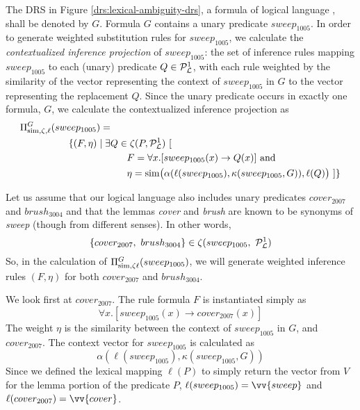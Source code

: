 The DRS in Figure \ref{drs:lexical-ambiguity-drs}, a formula of logical language
\loglang, shall be denoted by $G$.  Formula $G$ contains a unary predicate
$sweep_{1005}$.  In order to generate weighted substitution rules for
$sweep_{1005}$, we calculate the {\it contextualized inference projection} of
$sweep_{1005}$: the set of inference rules mapping $sweep_{1005}$ to each
(unary) predicate $Q \in {\cal{P}}_{{\cal{L}}}^1$, with each rule weighted by the
similarity of the vector representing the context of $sweep_{1005}$ in $G$ to
the vector representing the replacement $Q$. Since the unary predicate  occurs
in exactly one formula, $G$, we calculate the contextualized inference
projection as
\begin{align*}
&\Pi^G_{\simfunc, \zeta, \ell}(sweep_{1005}) = \\
& \hspace{50px} \{ (F, \eta) \mid \exists Q \in \zeta(P, \predsym{\loglang}^1)~[ \\
& \hspace{110px} F = \forall x.[sweep_{1005}(x) \to Q(x)] \text{ and } \\
& \hspace{110px} \eta = \simfunc\big(\alpha(\ell(sweep_{1005}), \kappa(sweep_{1005}, G)), \ell(Q)\big)~] \}
\end{align*}

Let us assume that our logical language \loglang also includes unary predicates
$cover_{2007}$ and $brush_{3004}$ and that the lemmas {\it cover} and {\it
brush} are known to be synonyms of {\it sweep} (though from different senses). 
In other words, \[ \{ cover_{2007},~ brush_{3004} \} \in \zeta(sweep_{1005},~
{\cal{P}}_{{\cal{L}}}^1) \] So, in the calculation of $\Pi^G_{\mathrm{sim},\zeta
\ell}(sweep_{1005})$, we will generate weighted inference rules $(F,\eta)$ for
both $cover_{2007}$ and $brush_{3004}$.

We look first at $cover_{2007}$.  The rule formula $F$ is instantiated simply as
\[ \forall x.[sweep_{1005}(x) \to cover_{2007}(x)] \]  The weight $\eta$ is the
similarity between the context of $sweep_{1005}$ in $G$, and $cover_{2007}$.
The context vector for $sweep_{1005}$ is calculated as \[
\alpha(\ell(sweep_{1005}), \kappa(sweep_{1005}, G)) \]  Since we defined the
lexical mapping $\ell(P)$ to simply return the vector from $V$ for the lemma
portion of the predicate $P$, $\ell(sweep_{1005}) = \vv{sweep}$ and
$\ell(cover_{2007}) = \vv{cover}$.  

